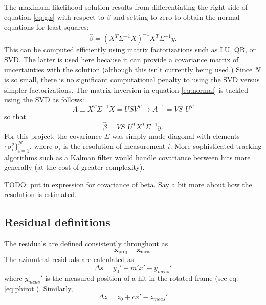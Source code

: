 \documentclass[12pt]{article}
\begin{document}
The maximum likelihood solution results from differentiating the right side of equation \ref{eq:gls} with respect to $\beta$ and setting to zero to obtain the normal equations for least squares:
 \begin{equation}\label{eq:normal}
 \hat\beta = (X^T \Sigma^{-1} X)^{-1} X^T \Sigma^{-1} y.
 \end{equation}
This can be computed efficiently using matrix factorizations such as LU, QR, or SVD. The latter is used here because it can provide a covariance matrix of uncertainties with the solution (although this isn't currently being used.) Since $N$ is so small, there is no significant computational penalty to using the SVD versus simpler factorizations. The matrix inversion in equation \ref{eq:normal} is tackled using the SVD as follows:
\begin{equation}\label{eq:svd}
A \equiv X^T \Sigma^{-1} X = U S V^T \to A^{-1} = V S^{\dagger} U^{T}
\end{equation}
so that 
\begin{equation}\label{eq:betahat}
\hat\beta = V S^{\dagger} U^{T} X^T \Sigma^{-1} y.
\end{equation}
For this project, the covariance $\Sigma$ was simply made diagonal with elements $\{\sigma_i^2 \}_{i=1}^N$, where $\sigma_i$ is the resolution of measurement $i$. More sophisticated tracking algorithms such as a Kalman filter would handle covariance between hits more generally (at the cost of greater complexity).

TODO: put in expression for covariance of beta. Say a bit more about how the resolution is estimated.

\subsection{Residual definitions}
The residuals are defined consistently throughout as 
\begin{equation}\label{eq:resdef}
\mathbf{x}_{\mathrm{proj}} - \mathbf{x}_{\mathrm{meas}}
\end{equation}
The azimuthal residuals are calculated as
\begin{equation} \label{eq:ds}
\Delta s = y_0' + m' x' - y_{meas}'
\end{equation}
where $y_{meas}'$ is the measured position of a hit in the rotated frame (see eq. \ref{eq:phirot}). Similarly,
\begin{equation} \label{eq:dz}
\Delta z = z_0 + cx' - z_{meas}'
\end{equation}
\end{document}
